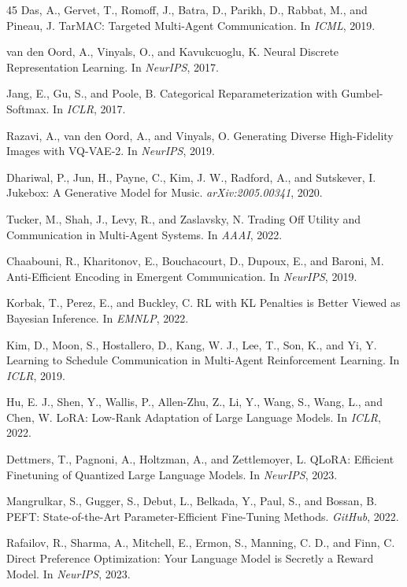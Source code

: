 \documentclass{article}
\begin{document}
\begin{thebibliography}{45}
 Das, A., Gervet, T., Romoff, J., Batra, D., Parikh, D., Rabbat, M., and Pineau, J. TarMAC: Targeted Multi-Agent Communication. In \emph{ICML}, 2019.

 van den Oord, A., Vinyals, O., and Kavukcuoglu, K. Neural Discrete Representation Learning. In \emph{NeurIPS}, 2017.

 Jang, E., Gu, S., and Poole, B. Categorical Reparameterization with Gumbel-Softmax. In \emph{ICLR}, 2017.

 Razavi, A., van den Oord, A., and Vinyals, O. Generating Diverse High-Fidelity Images with VQ-VAE-2. In \emph{NeurIPS}, 2019.

 Dhariwal, P., Jun, H., Payne, C., Kim, J. W., Radford, A., and Sutskever, I. Jukebox: A Generative Model for Music. \emph{arXiv:2005.00341}, 2020.

 Tucker, M., Shah, J., Levy, R., and Zaslavsky, N. Trading Off Utility and Communication in Multi-Agent Systems. In \emph{AAAI}, 2022.

 Chaabouni, R., Kharitonov, E., Bouchacourt, D., Dupoux, E., and Baroni, M. Anti-Efficient Encoding in Emergent Communication. In \emph{NeurIPS}, 2019.

 Korbak, T., Perez, E., and Buckley, C. RL with KL Penalties is Better Viewed as Bayesian Inference. In \emph{EMNLP}, 2022.

 Kim, D., Moon, S., Hostallero, D., Kang, W. J., Lee, T., Son, K., and Yi, Y. Learning to Schedule Communication in Multi-Agent Reinforcement Learning. In \emph{ICLR}, 2019.

 Hu, E. J., Shen, Y., Wallis, P., Allen-Zhu, Z., Li, Y., Wang, S., Wang, L., and Chen, W. LoRA: Low-Rank Adaptation of Large Language Models. In \emph{ICLR}, 2022.

 Dettmers, T., Pagnoni, A., Holtzman, A., and Zettlemoyer, L. QLoRA: Efficient Finetuning of Quantized Large Language Models. In \emph{NeurIPS}, 2023.

 Mangrulkar, S., Gugger, S., Debut, L., Belkada, Y., Paul, S., and Bossan, B. PEFT: State-of-the-Art Parameter-Efficient Fine-Tuning Methods. \emph{GitHub}, 2022.

 Rafailov, R., Sharma, A., Mitchell, E., Ermon, S., Manning, C. D., and Finn, C. Direct Preference Optimization: Your Language Model is Secretly a Reward Model. In \emph{NeurIPS}, 2023.


\end{thebibliography}
\end{document}
